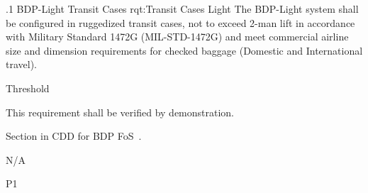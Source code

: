 \ONERQMTVKSA
{\RqtNumberBase.1}
{BDP-Light Transit Cases}
{rqt:Transit Cases Light}
{The BDP-Light system shall be configured in ruggedized transit cases, not to exceed 2-man lift in accordance with Military Standard 1472G (MIL-STD-1472G) and meet commercial airline size and dimension requirements for checked baggage (Domestic and International travel).}
{
	\item [Phase 1] Threshold
}
{This requirement shall be verified by demonstration.}
{
\item [5.5.7.2] Section in CDD for BDP FoS~\cite{ref__BDP_FOS_CDD}.
}
{
	\item N/A
}
{P1}

